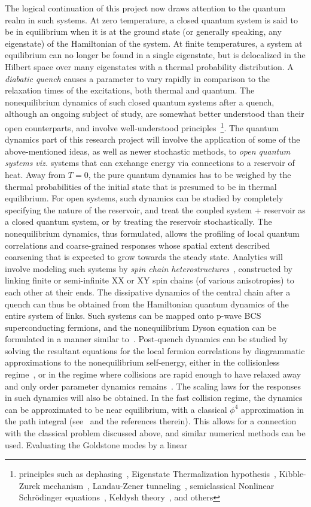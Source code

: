 \documentclass[a4paper,9pt]{article}
\begin{document}
The logical continuation of this project now draws attention to the quantum realm in such systems. At zero temperature, a closed quantum system is said to be in equilibrium when it is at the ground state (or generally speaking, any eigenstate) of the Hamiltonian of the system. At finite temperatures, a system at equilibrium can no longer be found in a single eigenstate, but is delocalized in the Hilbert space over many eigenstates with a thermal probability distribution. A \textit{diabatic quench} causes a  {parameter} to vary rapidly in comparison to the relaxation times of the excitations, both thermal and quantum. The nonequilibrium dynamics of such closed quantum systems after a quench, although an ongoing subject of study,  {are somewhat better understood than their open counterparts}, and involve well-understood principles~\footnote{principles such as dephasing~\cite{thermalization}, Eigenstate Thermalization hypothesis~\cite{thermalization,krishrev}, Kibble-Zurek mechanism~\cite{bikashbabu}, Landau-Zener tunneling~\cite{bikashbabu}, semiclassical Nonlinear Schr\"odinger equations~\cite{colrev,rammer}, Keldysh theory~\cite{gorkov, volkov}, and others}. The quantum dynamics part of this research project will involve the application of some of the above-mentioned ideas, as well as newer stochastic methods, to \textit{open quantum systems} \textit{viz.} systems that can exchange energy via connections to a reservoir of heat. Away from $T=0$, the pure quantum dynamics has to be weighed by the thermal probabilities of the initial state that is presumed to be in thermal equilibrium. For open systems, such dynamics can be studied by completely specifying the nature of the reservoir, and treat the coupled system + reservoir as a closed 
quantum system, or by treating the reservoir stochastically. The nonequilibrium dynamics, thus formulated, allows the profiling of local quantum correlations and coarse-grained responses whose spatial extent described coarsening that is expected to grow towards the steady state. Analytics will involve modeling such systems by \textit{spin chain heterostructures}~\cite{arrachea},  constructed by linking finite or semi-infinite XX or XY spin chains (of various anisotropies) to each other at their ends. The dissipative dynamics of the central chain after a quench can thus be obtained from the Hamiltonian quantum dynamics of the entire system of links. Such systems can be mapped onto p-wave BCS superconducting fermions, and the nonequilibrium Dyson equation can be formulated in a manner similar to~\cite{gorkov, volkov}. Post-quench dynamics can be studied by solving the resultant equations for the local fermion correlations by diagrammatic approximations to the nonequilibrium self-energy, either in the collisionless regime~\cite{volkov,ncnsd2012}, or in the regime where collisions are rapid enough to have relaxed away and only order parameter dynamics remains~\cite{ncnsd2012}. The scaling laws for the responses in such dynamics will also be obtained.  In the fast collision regime, the dynamics can be approximated to be near equilibrium, with a classical $\phi^4$ approximation in the path integral (see~\cite{colrev} and the references therein). This allows for a connection with the classical problem discussed above, and similar numerical methods can be used. Evaluating the Goldstone modes by a linear 
\end{document}
